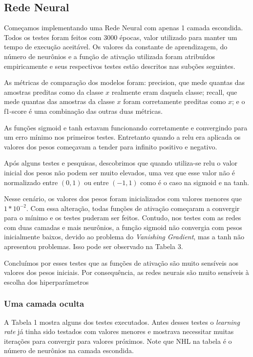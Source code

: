 \documentclass[conference]{IEEEtran}
\begin{document}
\subsection{Rede Neural}

	Começamos implementando uma Rede Neural com apenas 1 camada escondida. Todos os testes foram feitos com 3000 épocas, valor utilizado para manter um tempo de execução aceitável. Os valores da constante de aprendizagem, do número de neurônios e a função de ativação utilizada foram atribuídos empiricamente e seus respectivos testes estão descritos nas subções seguintes.
	
	As métricas de comparação dos modelos foram: precision, que mede quantas das amostras preditas como da classe $x$ realmente eram daquela classe; recall, que mede quantas das amostras da classe $x$ foram corretamente preditas como $x$; e o f1-score é uma combinação das outras duas métricas.
	
	As funções sigmoid e tanh estavam funcionando corretamente e convergindo para um erro mínimo nos primeiros testes. Entretanto quando a relu era aplicada os valores dos pesos começavam a tender para infinito positivo e negativo.
	
	Após alguns testes e pesquisas, descobrimos que quando utiliza-se relu o valor inicial dos pesos não podem ser muito elevados, uma vez que esse valor não é normalizado entre $(0,1)$ ou entre $(-1,1)$ como é o caso na sigmoid e na tanh.
	
	Nesse cenário, os valores dos pesos foram inicializados com valores menores que $1*10^{-2}$. Com essa alteração, todas funções de ativação começaram a convergir para o mínimo e os testes puderam ser feitos. Contudo, nos testes com as redes com duas camadas e mais neurônios, a função sigmoid não convergia com pesos inicialmente baixos, devido ao problema do \textit{Vanishing Gradient}, mas a tanh não apresentou problemas. Isso pode ser observado na Tabela 3.
	
	Concluímos por esses testes que as funções de ativação são muito sensíveis aos valores dos pesos iniciais. Por consequência, as redes neurais são muito sensíveis à escolha dos hiperparâmetros

\subsubsection{Uma camada oculta}
	
	A Tabela 1 mostra alguns dos testes executados. Antes desses testes o \textit{learning rate} já tinha sido testados com valores menores e mostrava necessitar muitas iterações para convergir para valores próximos. Note que NHL na tabela é o número de neurônios na camada escondida.
	
\end{document}
